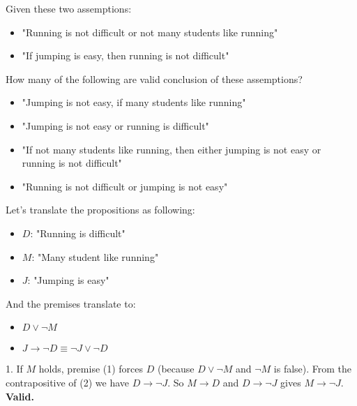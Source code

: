 \begin{exercise}[Explique AI] %
    Given these two assemptions: 
    \begin{itemize}[itemsep=1pt,label=$\circ$]
        \item "Running is not difficult or not many students like running"
        \item "If jumping is easy, then running is not difficult"
    \end{itemize}
    How many of the following are valid conclusion of these assemptions?
    \begin{itemize}[itemsep=1pt,label=$\circ$]
        \item "Jumping is not easy, if many students like running"
        \item "Jumping is not easy or running is difficult"
        \item "If not many students like running, then either jumping is not easy or running is not difficult"
        \item "Running is not difficult or jumping is not easy"
    \end{itemize}
    \Answer
    Let's translate the propositions as following:
    \begin{itemize}[itemsep=1pt,label=$\circ$]
        \item $D$: "Running is difficult"
        \item $M$: "Many student like running"
        \item $J$: "Jumping is easy"
    \end{itemize}
    And the premises translate to:
    \begin{itemize}[itemsep=1pt,label=$\circ$]
        \item $D \lor \neg M$
        \item $J \to \neg D \equiv \neg J \lor \neg D$ 
    \end{itemize}
    1. If $M$ holds, premise (1) forces $D$ (because $D \lor \neg M$ and $\neg M$ is false). From the contrapositive of (2) we have $D \to \neg J$. So $M \to D$ and $D \to \neg J$ gives $M \to \neg J$. \textbf{Valid.}
\end{exercise}
